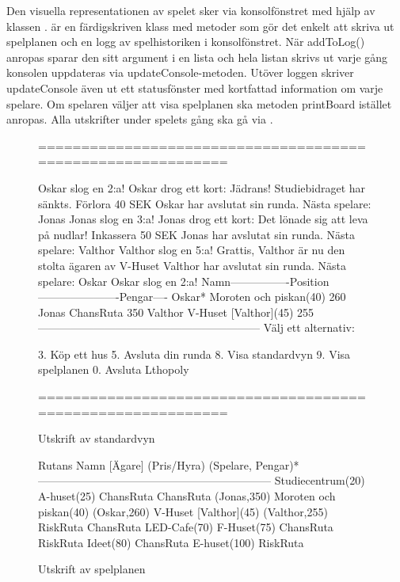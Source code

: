 Den visuella representationen av spelet sker via konsolfönstret med hjälp av klassen .  är en färdigskriven klass med metoder som gör det enkelt att skriva ut spelplanen och en logg av spelhistoriken i konsolfönstret.
 När addToLog() anropas sparar den sitt argument i en lista och hela listan skrivs ut varje gång konsolen uppdateras via updateConsole-metoden.
Utöver loggen skriver updateConsole även ut ett statusfönster med kortfattad information om varje spelare. 
Om spelaren väljer att visa spelplanen ska metoden printBoard istället anropas.
Alla utskrifter under spelets gång ska gå via .
\newline

\begin{figure}[H]
\centering

\begin{REPL}
============================================================

Oskar slog en 2:a!
Oskar drog ett kort: Jädrans! Studiebidraget har sänkts. Förlora 40 SEK
Oskar har avslutat sin runda.
Nästa spelare: Jonas
Jonas slog en 3:a!
Jonas drog ett kort: Det lönade sig att leva på nudlar! Inkassera 50 SEK
Jonas har avslutat sin runda.
Nästa spelare: Valthor
Valthor slog en 5:a!
Grattis, Valthor är nu den stolta ägaren av V-Huset
Valthor har avslutat sin runda.
Nästa spelare: Oskar
Oskar slog en 2:a!
Namn----------------Position----------------------Pengar----
Oskar*              Moroten och piskan(40)        260       
Jonas               ChansRuta                     350       
Valthor             V-Huset [Valthor](45)         255       
------------------------------------------------------------
Välj ett alternativ:

	3. Köp ett hus                   
	5. Avsluta din runda             
	8. Visa standardvyn              
	9. Visa spelplanen               
	0. Avsluta Lthopoly              

============================================================

\end{REPL}
\caption {Utskrift av standardvyn}
\label{fig:scalajava:lthopoly-team:defaultview}
\end{figure}

\begin{figure}[H]
\centering

\begin{REPL}
Rutans Namn [Ägare] (Pris/Hyra) (Spelare, Pengar)*
---------------------------------------------------------------
Studiecentrum(20)
A-huset(25) 
ChansRuta 
ChansRuta (Jonas,350)
Moroten och piskan(40) (Oskar,260)
V-Huset [Valthor](45) (Valthor,255)
RiskRuta 
ChansRuta 
LED-Cafe(70) 
F-Huset(75) 
ChansRuta 
RiskRuta 
Ideet(80) 
ChansRuta 
E-huset(100) 
RiskRuta 
\end{REPL}

\caption {Utskrift av spelplanen}
\label{fig:scalajava:lthopoly-team:boardview}
\end{figure}

